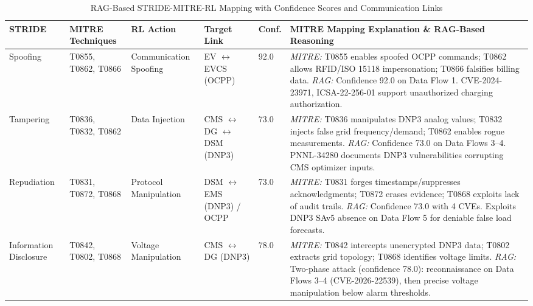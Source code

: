 \begin{table}[t]
    \centering
    \caption{RAG-Based STRIDE-MITRE-RL Mapping with Confidence Scores and Communication Links}
    \label{tab:stride_mitre_rl_detailed}
    \renewcommand{\arraystretch}{1.15}%
    \small
    \begin{tabular}{|p{}|p{}|p{}|p{}|p{}|p{}|}
        \hline
        \textbf{STRIDE} &
        \textbf{MITRE Techniques} &
        \textbf{RL Action} &
        \textbf{Target Link} &
        \textbf{Conf.} &
        \textbf{MITRE Mapping Explanation \& RAG-Based Reasoning} \\
        \hline
        
        Spoofing &
        T0855, T0862, T0866 &
        Communication Spoofing &
        EV $\leftrightarrow$ EVCS (OCPP) &
        92.0 &
        \textit{MITRE:} T0855 enables spoofed OCPP commands; T0862 allows RFID/ISO 15118 impersonation; T0866 falsifies billing data. \textit{RAG:} Confidence 92.0 on Data Flow 1. CVE-2024-23971, ICSA-22-256-01 support unauthorized charging authorization. \\[0.3em] \hline
        
        Tampering &
        T0836, T0832, T0862 &
        Data Injection &
        CMS $\leftrightarrow$ DG $\leftrightarrow$ DSM (DNP3) &
        73.0 &
        \textit{MITRE:} T0836 manipulates DNP3 analog values; T0832 injects false grid frequency/demand; T0862 enables rogue measurements. \textit{RAG:} Confidence 73.0 on Data Flows 3--4. PNNL-34280 documents DNP3 vulnerabilities corrupting CMS optimizer inputs. \\[0.3em] \hline
        
        Repudiation &
        T0831, T0872, T0868 &
        Protocol Manipulation &
        DSM $\leftrightarrow$ EMS (DNP3) / OCPP &
        73.0 &
        \textit{MITRE:} T0831 forges timestamps/suppresses acknowledgments; T0872 erases evidence; T0868 exploits lack of audit trails. \textit{RAG:} Confidence 73.0 with 4 CVEs. Exploits DNP3 SAv5 absence on Data Flow 5 for deniable false load forecasts. \\[0.3em] \hline
        
        Information Disclosure &
        T0842, T0802, T0868 &
        Voltage Manipulation &
        CMS $\leftrightarrow$ DG (DNP3) &
        78.0 &
        \textit{MITRE:} T0842 intercepts unencrypted DNP3 data; T0802 extracts grid topology; T0868 identifies voltage limits. \textit{RAG:} Two-phase attack (confidence 78.0): reconnaissance on Data Flows 3--4 (CVE-2026-22539), then precise voltage manipulation below alarm thresholds. \\[0.3em] \hline
        

\end{tabular}
\end{table}
